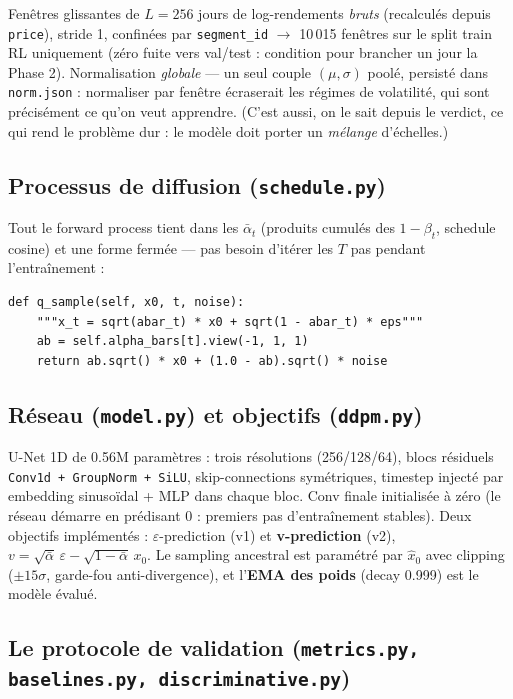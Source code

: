 \documentclass[11pt,a4paper]{article}
\newcommand{\code}[1]{\texttt{#1}}
\begin{document}
Fenêtres glissantes de $L=256$ jours de log-rendements \emph{bruts}
(recalculés depuis \code{price}), stride 1, confinées par \code{segment\_id}
$\to$ 10\,015 fenêtres sur le split train RL uniquement (zéro fuite vers
val/test : condition pour brancher un jour la Phase 2). Normalisation
\emph{globale} --- un seul couple $(\mu, \sigma)$ poolé, persisté dans
\code{norm.json} : normaliser par fenêtre écraserait les régimes de
volatilité, qui sont précisément ce qu'on veut apprendre. (C'est aussi, on le
sait depuis le verdict, ce qui rend le problème dur : le modèle doit porter
un \emph{mélange} d'échelles.)

\subsection{Processus de diffusion (\code{schedule.py})}

Tout le forward process tient dans les $\bar\alpha_t$ (produits cumulés des
$1-\beta_t$, schedule cosine) et une forme fermée --- pas besoin d'itérer les
$T$ pas pendant l'entraînement :

\begin{lstlisting}
def q_sample(self, x0, t, noise):
    """x_t = sqrt(abar_t) * x0 + sqrt(1 - abar_t) * eps"""
    ab = self.alpha_bars[t].view(-1, 1, 1)
    return ab.sqrt() * x0 + (1.0 - ab).sqrt() * noise
\end{lstlisting}

\subsection{Réseau (\code{model.py}) et objectifs (\code{ddpm.py})}

U-Net 1D de 0.56M paramètres : trois résolutions (256/128/64), blocs
résiduels \code{Conv1d + GroupNorm + SiLU}, skip-connections symétriques,
timestep injecté par embedding sinusoïdal + MLP dans chaque bloc. Conv finale
initialisée à zéro (le réseau démarre en prédisant 0 : premiers pas
d'entraînement stables). Deux objectifs implémentés :
$\varepsilon$-prediction (v1) et \textbf{v-prediction} (v2),
$v = \sqrt{\bar\alpha}\,\varepsilon - \sqrt{1-\bar\alpha}\,x_0$. Le sampling
ancestral est paramétré par $\hat{x}_0$ avec clipping ($\pm 15\sigma$,
garde-fou anti-divergence), et l'\textbf{EMA des poids} (decay 0.999) est le
modèle évalué.

\subsection{Le protocole de validation (\code{metrics.py, baselines.py,
discriminative.py})}
\end{document}
